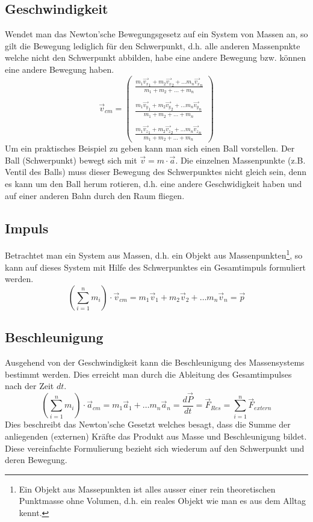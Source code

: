\subsection{Geschwindigkeit}
Wendet man das Newton'sche Bewegungsgesetz auf ein System von
Massen an, so gilt die Bewegung lediglich für den Schwerpunkt,
d.h. alle anderen Massenpnkte welche nicht den Schwerpunkt abbilden,
habe eine andere Bewegung bzw. können eine andere Bewegung haben.
\[ \boxed{ \vec{v}_{cm} = 
	\begin{pmatrix} 
		\frac{m_1 \vec{v_x}_1 
			+ m_2 \vec{v_x}_2 
			+ \dots m_n \vec{v_x}_n}
			{m_1 + m_2 + \dots + m_n} \\
		\\
		\frac{m_1 \vec{v_y}_1 
			+ m_2 \vec{v_y}_2 
			+ \dots m_n \vec{v_y}_n}
			{m_1 + m_2 + \dots + m_n} \\
		\\
		\frac{m_1 \vec{v_z}_1 
			+ m_2 \vec{v_z}_2 
			+ \dots m_n \vec{v_z}_n}
			{m_1 + m_2 + \dots + m_n}
	\end{pmatrix} }
\]
Um ein praktisches Beispiel zu geben kann man sich einen Ball vorstellen.
Der Ball (Schwerpunkt) bewegt sich mit $\vec{v} = m \cdot \vec{a}$.
Die einzelnen Massenpunkte (z.B. Ventil des Balls) muss dieser Bewegung
des Schwerpunktes nicht gleich sein, denn es kann um den Ball herum
rotieren, d.h. eine andere Geschwidigkeit haben und auf einer anderen
Bahn durch den Raum fliegen.

\subsection{Impuls}
Betrachtet man ein System aus Massen, d.h. ein Objekt aus 
Massenpunkten\footnote{Ein Objekt aus Massepunkten ist alles ausser 
einer rein theoretischen Punktmasse ohne Volumen, d.h. ein reales Objekt
wie man es aus dem Alltag kennt.}, so kann
auf dieses System mit Hilfe des Schwerpunktes ein Gesamtimpuls
formuliert werden.
\[ \boxed{
	\left( \sum_{i=1}^n m_i \right) \cdot \vec{v}_{cm} 
		= m_1 \vec{v}_1 + m_2 \vec{v}_2 + \dots m_n \vec{v}_n
		=\vec{p} }
\]

\subsection{Beschleunigung}
Ausgehend von der Geschwindigkeit kann die Beschleunigung des 
Massensystems bestimmt werden. Dies erreicht man durch die 
Ableitung des Gesamtimpulses nach der Zeit $dt$.
\[ \boxed{
	\left( \sum_{i=1}^n m_i \right) \cdot \vec{a}_{cm} 
		= m_1 \vec{a}_1 + \dots m_n \vec{a}_n
		= \frac{d \vec{P}}{dt} 
		= \vec{F}_{Res}
		= \sum_{i=1}^n \vec{F}_{extern} }
\]
Dies beschreibt das Newton'sche Gesetzt welches besagt, dass die 
Summe der anliegenden (externen) Kräfte das Produkt aus Masse und
Beschleunigung bildet. Diese vereinfachte Formulierung bezieht sich
wiederum auf den Schwerpunkt und deren Bewegung.



